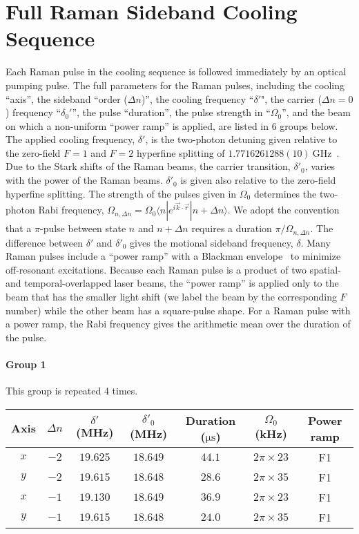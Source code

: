 
\chapter{Full Raman Sideband Cooling Sequence}
\label{appendex:rsc}

Each Raman pulse in the cooling sequence is followed immediately by an optical pumping pulse.
The full parameters for the Raman pulses, including the cooling ``axis'',
the sideband ``order ($\Delta n$)'', the cooling frequency ``$\delta '$",
the carrier ($\Delta n=0$) frequency ``$\delta_0'$'', the pulse ``duration'',
the pulse strength in ``$\Omega_0$'',
and the beam on which a non-uniform ``power ramp'' is applied, are listed in 6 groups below.
The applied cooling frequency, $\delta'$,
is the two-photon detuning given relative to the zero-field $F=1$ and $F=2$ hyperfine splitting
of $1.7716261288(10)~\mathrm{GHz}$~\cite{steck_sodium_2019}.
Due to the Stark shifts of the Raman beams, the carrier transition, $\delta'_0$,
varies with the power of the Raman beams.
$\delta'_0$ is given also relative to the zero-field hyperfine splitting.
The strength of the pulses given in $\Omega_0$ determines the two-photon Rabi frequency,
$\Omega_{n,\Delta n}=\Omega_0 \langle n|e^{i \vec{k} \cdot \vec{r}}|n+\Delta n\rangle$.
We adopt the convention that a $\pi$-pulse between state $n$ and $n+\Delta n$ requires a duration $\pi/\Omega_{n,\Delta n}$.
The difference between $\delta'$ and $\delta'_0$ gives the motional sideband frequency, $\delta$.
Many Raman pulses include a ``power ramp'' with a Blackman envelope~\cite{kasevich_laser_1992} to minimize off-resonant excitations.
Because each Raman pulse is a product of two spatial- and temporal-overlapped laser beams,
the ``power ramp'' is applied only to the beam that has the smaller light shift
(we label the beam by the corresponding $F$ number) while the other beam has a square-pulse shape.
For a Raman pulse with a power ramp,
the Rabi frequency gives the arithmetic mean over the duration of the pulse.

\newpage
\subsubsection*{Group 1}
This group is repeated 4 times.
\begin{center}
  \begin{tabular}{|c|c|c|c|c|c|c|}
    \hline
    Axis&$\Delta n$&$\delta'$ (MHz)&$\delta'_0$ (MHz)&Duration ($\mathrm{\mu s}$)& $\Omega_0$ (kHz)&Power ramp\\\hline
    $x$&$-2$&$19.625$&$18.649$&$44.1$&$2\pi\times23$&F1\\\hline
    $y$&$-2$&$19.615$&$18.648$&$28.6$&$2\pi\times35$&F1\\\hline
    $x$&$-1$&$19.130$&$18.649$&$36.9$&$2\pi\times23$&F1\\\hline
    $y$&$-1$&$19.615$&$18.648$&$24.0$&$2\pi\times35$&F1\\\hline
  \end{tabular}
\end{center}

